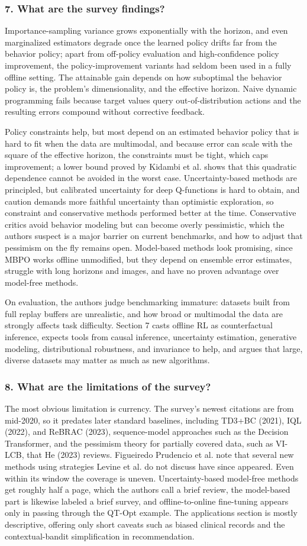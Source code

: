 \documentclass[11pt]{article}
\newcommand{\question}[1]{\subsubsection*{#1}}
\begin{document}
\question{7. What are the survey findings?}

Importance-sampling variance grows exponentially with the horizon, and even marginalized estimators degrade once the learned policy drifts far from the behavior policy; apart from off-policy evaluation and high-confidence policy improvement, the policy-improvement variants had seldom been used in a fully offline setting. The attainable gain depends on how suboptimal the behavior policy is, the problem's dimensionality, and the effective horizon. Naive dynamic programming fails because target values query out-of-distribution actions and the resulting errors compound without corrective feedback.

Policy constraints help, but most depend on an estimated behavior policy that is hard to fit when the data are multimodal, and because error can scale with the square of the effective horizon, the constraints must be tight, which caps improvement; a lower bound proved by Kidambi et al. shows that this quadratic dependence cannot be avoided in the worst case. Uncertainty-based methods are principled, but calibrated uncertainty for deep Q-functions is hard to obtain, and caution demands more faithful uncertainty than optimistic exploration, so constraint and conservative methods performed better at the time. Conservative critics avoid behavior modeling but can become overly pessimistic, which the authors suspect is a major barrier on current benchmarks, and how to adjust that pessimism on the fly remains open. Model-based methods look promising, since MBPO works offline unmodified, but they depend on ensemble error estimates, struggle with long horizons and images, and have no proven advantage over model-free methods.

On evaluation, the authors judge benchmarking immature: datasets built from full replay buffers are unrealistic, and how broad or multimodal the data are strongly affects task difficulty. Section 7 casts offline RL as counterfactual inference, expects tools from causal inference, uncertainty estimation, generative modeling, distributional robustness, and invariance to help, and argues that large, diverse datasets may matter as much as new algorithms.

\question{8. What are the limitations of the survey?}

The most obvious limitation is currency. The survey's newest citations are from mid-2020, so it predates later standard baselines, including TD3+BC (2021), IQL (2022), and ReBRAC (2023), sequence-model approaches such as the Decision Transformer, and the pessimism theory for partially covered data, such as VI-LCB, that He (2023) reviews. Figueiredo Prudencio et al. note that several new methods using strategies Levine et al. do not discuss have since appeared. Even within its window the coverage is uneven. Uncertainty-based model-free methods get roughly half a page, which the authors call a brief review, the model-based part is likewise labeled a brief survey, and offline-to-online fine-tuning appears only in passing through the QT-Opt example. The applications section is mostly descriptive, offering only short caveats such as biased clinical records and the contextual-bandit simplification in recommendation.
\end{document}
